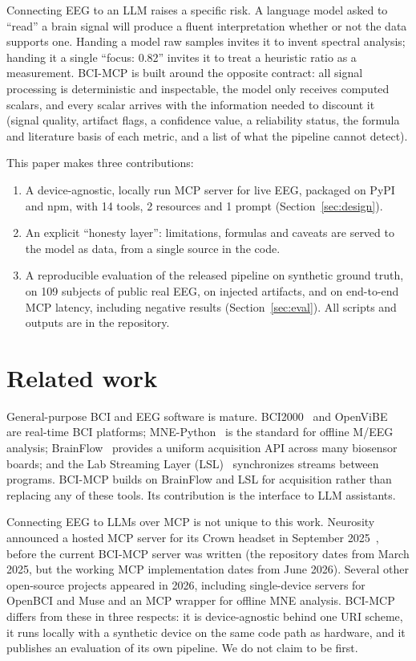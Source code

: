 \documentclass[10pt,twocolumn,letterpaper]{article}
\begin{document}
Connecting EEG to an LLM raises a specific risk. A language model asked to
``read'' a brain signal will produce a fluent interpretation whether or not the
data supports one. Handing a model raw samples invites it to invent spectral
analysis; handing it a single ``focus: 0.82'' invites it to treat a heuristic
ratio as a measurement. BCI-MCP is built around the opposite contract: all signal
processing is deterministic and inspectable, the model only receives computed
scalars, and every scalar arrives with the information needed to discount it
(signal quality, artifact flags, a confidence value, a reliability status, the
formula and literature basis of each metric, and a list of what the pipeline
cannot detect).

This paper makes three contributions:
\begin{enumerate}\setlength{\itemsep}{0pt}
  \item A device-agnostic, locally run MCP server for live EEG, packaged on PyPI
        and npm, with 14 tools, 2 resources and 1 prompt (Section~\ref{sec:design}).
  \item An explicit ``honesty layer'': limitations, formulas and caveats are
        served to the model as data, from a single source in the code.
  \item A reproducible evaluation of the released pipeline on synthetic ground
        truth, on 109 subjects of public real EEG, on injected artifacts, and on
        end-to-end MCP latency, including negative results
        (Section~\ref{sec:eval}). All scripts and outputs are in the repository.
\end{enumerate}

\section{Related work}

General-purpose BCI and EEG software is mature. BCI2000~\citep{schalk2004} and
OpenViBE~\citep{renard2010} are real-time BCI platforms; MNE-Python~\citep{gramfort2013}
is the standard for offline M/EEG analysis; BrainFlow~\citep{brainflow} provides a
uniform acquisition API across many biosensor boards; and the Lab Streaming Layer
(LSL)~\citep{kothe2025} synchronizes streams between programs. BCI-MCP builds on
BrainFlow and LSL for acquisition rather than replacing any of these tools. Its
contribution is the interface to LLM assistants.

Connecting EEG to LLMs over MCP is not unique to this work. Neurosity announced a
hosted MCP server for its Crown headset in September 2025~\citep{neurositymcp},
before the current BCI-MCP server was written (the repository dates from March
2025, but the working MCP implementation dates from June 2026). Several other
open-source projects appeared in 2026, including single-device servers for
OpenBCI and Muse and an MCP wrapper for offline MNE analysis. BCI-MCP differs
from these in three respects: it is device-agnostic behind one URI scheme, it runs
locally with a synthetic device on the same code path as hardware, and it
publishes an evaluation of its own pipeline. We do not claim to be first.
\end{document}
